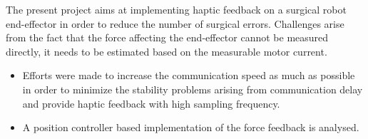 The present project aims at implementing haptic feedback on a surgical robot end-effector in order to reduce the number of surgical errors. %
Challenges arise from the fact that the force affecting the end-effector cannot be measured directly, it needs to be estimated based on the measurable motor current.
\begin{itemize}
	
	\item Efforts were made to increase the communication speed as much as possible in order to minimize the stability problems arising from communication delay and provide haptic feedback with high sampling frequency.
\item A position controller based implementation of the force feedback is analysed.
\end{itemize} 
